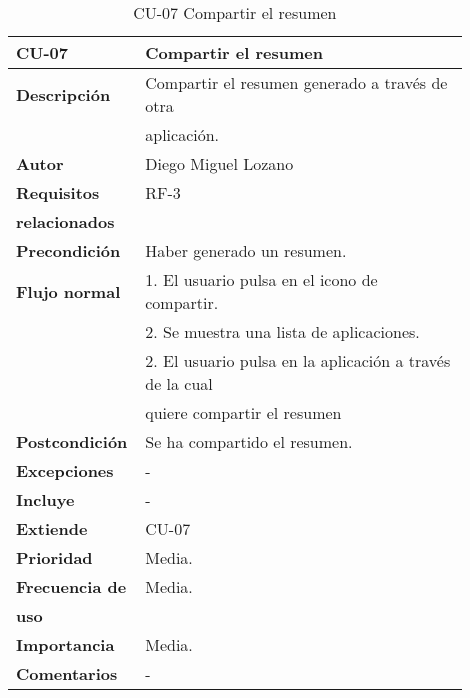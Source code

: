 \begin{longtable}{>{\raggedright}b{0.2\linewidth}>{\raggedright\arraybackslash}b{0.7\linewidth}}
	\toprule
	\textbf{CU-07} & \textbf{Compartir el resumen} \\
	\toprule
	\endhead
	
	\toprule
	\caption{CU-07 Compartir el resumen}
	\endfoot
	
	\small{\textbf{Descripción}} & Compartir el resumen generado a través de otra \\
	& aplicación. \\
	\small{\textbf{Autor}} & Diego Miguel Lozano \\
	\small{\textbf{Requisitos}} & RF-3  \\
	\small{\textbf{relacionados}} & \\
	\small{\textbf{Precondición}} & Haber generado un resumen. \\
	\small{\textbf{Flujo normal}} & \quad \small{1. El usuario pulsa en el icono de compartir.} \\
	& \quad \small{2. Se muestra una lista de aplicaciones.} \\
	& \quad \small{2. El usuario pulsa en la aplicación a través de la cual} \\
	& \qquad \small{quiere compartir el resumen} \\
	\small{\textbf{Postcondición}} & Se ha compartido el resumen. \\
	\small{\textbf{Excepciones}} & - \\
	\small{\textbf{Incluye}} & - \\
	\small{\textbf{Extiende}} & CU-07 \\
	\small{\textbf{Prioridad}} & Media. \\
	\small{\textbf{Frecuencia de}} & Media. \\
	\small{\textbf{uso}} & \\
	\small{\textbf{Importancia}} & Media. \\
	\small{\textbf{Comentarios}} & - \\
\end{longtable}


